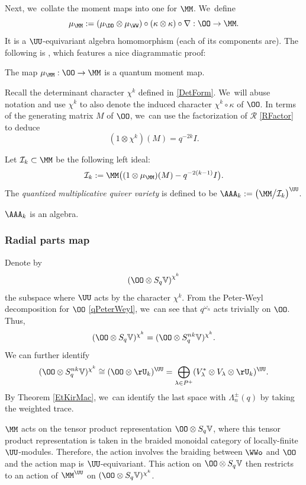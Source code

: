 Next, we~collate the moment maps into one for $\MM$. We~define
\[
\mu_{\MM}:=(\mu_\DD\otimes\mu_\WW)\circ(\kappa\otimes\kappa)\circ\nabla:\OO\to\MM.
\]
It is a $\UU$-equivariant algebra homomorphism (each of its components are).
The following is \cite[Prop.\,3.10]{GanJorSaf}, which features a nice diagrammatic proof:

\begin{prop}\label{TensorMoment}
The map $\mu_{\MM}:\OO\to\MM$ is a quantum moment map.
\end{prop}

Recall the determinant character $\chi^k$ defined in \eqref{DetForm}. We~will abuse notation and use $\chi^k$ to also denote the induced character $\chi^k\circ\kappa$ of $\OO$.
In terms of the generating matrix $M$ of $\OO$, we~can use the factorization of $\mathcal{R}$ \eqref{RFactor} to deduce
\[
(1\otimes\chi^k)(M)=q^{-2k}I.
\]

\begin{defn}
Let $\mathcal{I}_k\subset\MM$ be the following left ideal:
\[
\mathcal{I}_k:=\MM\bigl((1\otimes\mu_{\MM})(M)-q^{-2(k-1)}I \bigr).
\]
The \textit{quantized multiplicative quiver variety} is defined to be $\AAA_k:=\big(\MM\big/\mathcal{I}_k\big)^\UU$.
\end{defn}

\begin{prop}\label{RedAlgProp}
$\AAA_k$ is an algebra.
\end{prop}

\subsubsection{Radial parts map}
Denote by
\[
\left(\OO\otimes S_q\mathbb{V} \right)^{\chi^k}
\]
the subspace where $\UU$ acts by the character $\chi^k$.
From the Peter-Weyl decomposition for $\OO$ \eqref{qPeterWeyl}, we~can see that $q^{\omega_n}$ acts trivially on $\OO$.
Thus,
\[
(\OO\otimes S_q\mathbb{V})^{\chi^k}=(\OO\otimes S_q^{nk}\mathbb{V})^{\chi^k}.
\]
We can further identify
\[
(\OO\otimes S_q^{nk}\mathbb{V})^{\chi^k}\cong (\OO\otimes \rU_k)^\UU=\bigoplus_{\lambda\in P^+}(V_\lambda^*\otimes V_\lambda\otimes \rU_k)^{\UU}.
\]
By Theorem \ref{EtKirMac}, we~can identify the last space with $\Lambda_n^\pm(q)$ by taking the weighted trace.

$\MM$ acts on the tensor product representation $\OO\otimes S_q\mathbb{V}$, where this tensor product representation is taken in the braided monoidal category of locally-finite $\UU$-modules.
Therefore, the action involves the braiding between $\WWo$ and $\OO$ and the action map is $\UU$\nobreakdash-equi\-variant.
This action on $\OO\otimes S_q\mathbb{V}$ then restricts to an action of $\MM^\UU$ on $(\OO\otimes S_q\mathbb{V})^{\chi^k}$.

